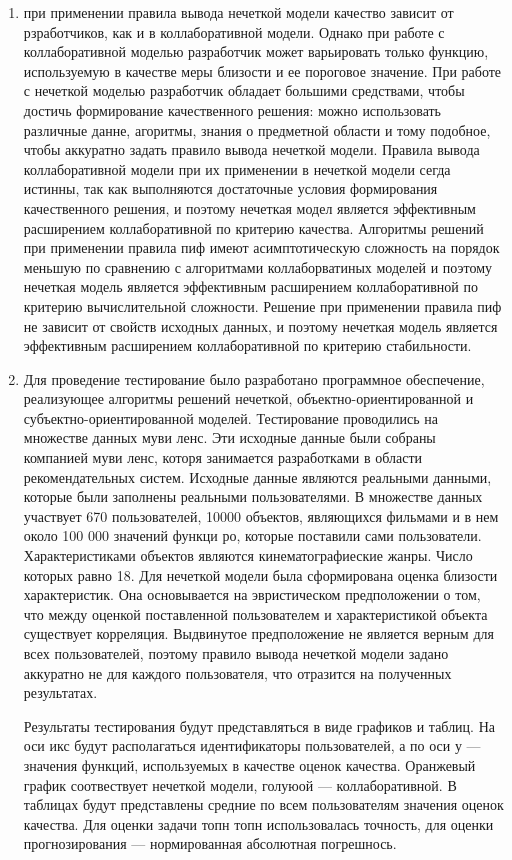 \documentclass[a4paper,11pt]{proc}
\begin{document}
{\begin{enumerate}
	\item при применении правила вывода нечеткой модели качество зависит от
		рзработчиков, как и в коллаборативной модели. Однако при работе с
		коллаборативной моделью разработчик может варьировать только функцию,
		используемую в качестве меры близости и ее пороговое значение. При
		работе с нечеткой моделью разработчик обладает большими средствами,
		чтобы достичь формирование качественного решения: можно использовать
		различные данне, агоритмы, знания о предметной области и тому подобное,
		чтобы аккуратно задать правило вывода нечеткой модели.
		Правила вывода коллаборативной модели при их применении
		в нечеткой модели сегда истинны, так как выполняются достаточные
		условия формирования качественного решения, и поэтому нечеткая модел
		является эффективным расширением коллаборативной по критерию качества.
		Алгоритмы решений при применении правила пиф имеют
		асимптотическую сложность на порядок меньшую по сравнению с алгоритмами
		коллаборватиных моделей и поэтому нечеткая модель является эффективным
		расширением коллаборативной по критерию вычислительной сложности.
		Решение при применении правила пиф не зависит
		от свойств исходных данных, и поэтому нечеткая модель является
		эффективным расширением коллаборативной по критерию стабильности.

	\item Для проведение тестирование было разработано программное обеспечение,
		реализующее алгоритмы решений нечеткой, объектно-ориентированной и
		субъектно-ориентированной моделей.
		Тестирование проводились на множестве данных муви ленс.
		Эти исходные данные были собраны компанией муви ленс, которя
		занимается разработками в области рекомендательных систем. Исходные
		данные являются реальными данными, которые были заполнены реальными
		пользователями. В множестве данных участвует 670 пользователей, 10000
		объектов, являющихся фильмами и в нем около 100 000 значений
		функци ро, которые поставили сами пользователи.
		Характеристиками объектов являются кинематографиеские жанры. Число
		которых равно 18. Для нечеткой модели была сформирована
		оценка близости характеристик. Она основывается на эвристическом
		предположении о том, что
		между оценкой поставленной пользователем
		и характеристикой объекта существует корреляция. Выдвинутое
		предположение не является верным для всех пользователей, поэтому
		правило вывода нечеткой модели задано аккуратно не для каждого
		пользователя, что отразится на полученных результатах.

		Результаты
		тестирования будут представляться в виде графиков и таблиц. На оси икс
		будут располагаться идентификаторы пользователей, а по оси у ---
		значения функций, используемых в качестве оценок качества. Оранжевый
		график соотвествует нечеткой модели, голуюой --- коллаборативной. В
		таблицах будут представлены средние по всем пользователям значения
		оценок качества. Для оценки задачи топн
		топн использовалась точность, для оценки прогнозирования
		--- нормированная абсолютная погрешнось.



\end{enumerate}}
\end{document}

